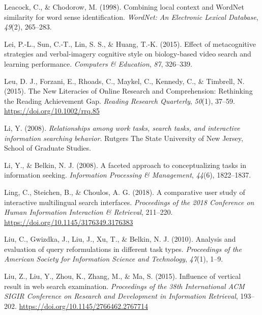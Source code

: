 \documentclass[letterpaper, nobind]{templates/ociamthesis}
\newlength{\cslhangindent}
\newenvironment{CSLReferences}[2] %
 {%
  \setlength{\parindent}{0pt}
  \ifodd #1
  \let\oldpar\par
  \def\par{\hangindent=\cslhangindent\oldpar}
  \fi
  \setlength{\parskip}{1mm}
  \setlength{\baselineskip}{6mm}
 }%
 {}
\begin{document}
\begin{CSLReferences}{1}{0}
\leavevmode{}%
Leacock, C., \& Chodorow, M. (1998). Combining local context and WordNet similarity for word sense identification. \emph{WordNet: An Electronic Lexical Database}, \emph{49}(2), 265--283.

\leavevmode{}%
Lei, P.-L., Sun, C.-T., Lin, S. S., \& Huang, T.-K. (2015). Effect of metacognitive strategies and verbal-imagery cognitive style on biology-based video search and learning performance. \emph{Computers \& Education}, \emph{87}, 326--339.

\leavevmode{}%
Leu, D. J., Forzani, E., Rhoads, C., Maykel, C., Kennedy, C., \& Timbrell, N. (2015). The {New Literacies} of {Online Research} and {Comprehension}: Rethinking the {Reading Achievement Gap}. \emph{Reading Research Quarterly}, \emph{50}(1), 37--59. \url{https://doi.org/10.1002/rrq.85}

\leavevmode{}%
Li, Y. (2008). \emph{Relationships among work tasks, search tasks, and interactive information searching behavior}. Rutgers The State University of New Jersey, School of Graduate Studies.

\leavevmode{}%
Li, Y., \& Belkin, N. J. (2008). A faceted approach to conceptualizing tasks in information seeking. \emph{Information Processing \& Management}, \emph{44}(6), 1822--1837.

\leavevmode{}%
Ling, C., Steichen, B., \& Choulos, A. G. (2018). A comparative user study of interactive multilingual search interfaces. \emph{Proceedings of the 2018 Conference on Human Information Interaction \& Retrieval}, 211--220. \url{https://doi.org/10.1145/3176349.3176383}

\leavevmode{}%
Liu, C., Gwizdka, J., Liu, J., Xu, T., \& Belkin, N. J. (2010). Analysis and evaluation of query reformulations in different task types. \emph{Proceedings of the American Society for Information Science and Technology}, \emph{47}(1), 1--9.

\leavevmode{}%
Liu, Z., Liu, Y., Zhou, K., Zhang, M., \& Ma, S. (2015). Influence of vertical result in web search examination. \emph{Proceedings of the 38th International {ACM SIGIR} Conference on Research and Development in Information Retrieval}, 193--202. \url{https://doi.org/10.1145/2766462.2767714}


\end{CSLReferences}
\end{document}
